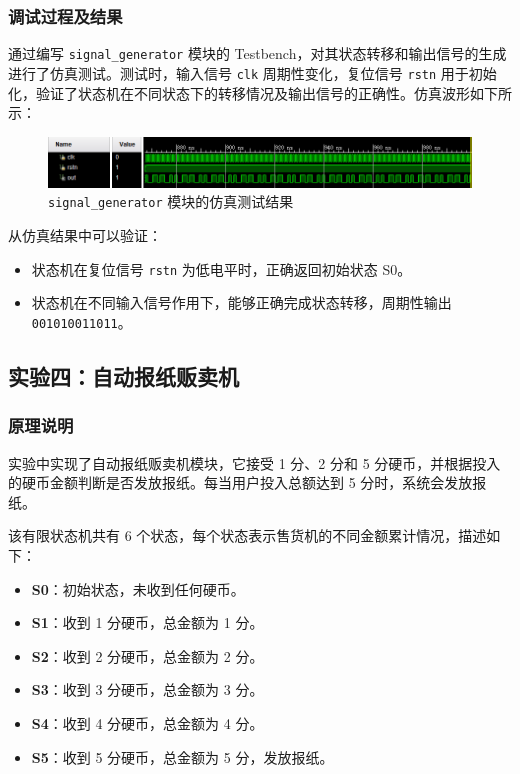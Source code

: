 \documentclass[zihao=5, UTF8]{article}
\theoremstyle{MyLineTheoremStyle} %
\theoremstyle{MyBlockTheoremStyle} %
\theoremstyle{MySubsubsectionStyle} %
\begin{document}
\subsubsection{调试过程及结果}  
通过编写 \texttt{signal\_generator} 模块的 Testbench，对其状态转移和输出信号的生成进行了仿真测试。测试时，输入信号 \texttt{clk} 周期性变化，复位信号 \texttt{rstn} 用于初始化，验证了状态机在不同状态下的转移情况及输出信号的正确性。仿真波形如下所示：  
\begin{figure}[htbp]  
    \centering  
    \includegraphics[width=\textwidth]{signal_generator.png} %
    \caption{\texttt{signal\_generator} 模块的仿真测试结果}  
    \label{fig:signal_generator_simulation}  
\end{figure}  

从仿真结果中可以验证：  
\begin{itemize}  
    \item 状态机在复位信号 \texttt{rstn} 为低电平时，正确返回初始状态 S0。  
    \item 状态机在不同输入信号作用下，能够正确完成状态转移，周期性输出 \texttt{001010011011}。  
\end{itemize}  

\subsection{实验四：自动报纸贩卖机}  
\subsubsection{原理说明}  
实验中实现了自动报纸贩卖机模块，它接受 1 分、2 分和 5 分硬币，并根据投入的硬币金额判断是否发放报纸。每当用户投入总额达到 5 分时，系统会发放报纸。  

该有限状态机共有 6 个状态，每个状态表示售货机的不同金额累计情况，描述如下：  
\begin{itemize}  
    \item \textbf{S0}：初始状态，未收到任何硬币。  
    \item \textbf{S1}：收到 1 分硬币，总金额为 1 分。  
    \item \textbf{S2}：收到 2 分硬币，总金额为 2 分。  
    \item \textbf{S3}：收到 3 分硬币，总金额为 3 分。  
    \item \textbf{S4}：收到 4 分硬币，总金额为 4 分。  
    \item \textbf{S5}：收到 5 分硬币，总金额为 5 分，发放报纸。  
\end{itemize}  
\end{document}
